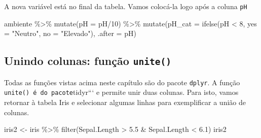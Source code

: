 \documentclass[
]{book}
\newenvironment{Shaded}{\begin{snugshade}}{\end{snugshade}}
\newcommand{\AttributeTok}[1]{\textcolor[rgb]{0.77,0.63,0.00}{#1}}
\newcommand{\DecValTok}[1]{\textcolor[rgb]{0.00,0.00,0.81}{#1}}
\newcommand{\FloatTok}[1]{\textcolor[rgb]{0.00,0.00,0.81}{#1}}
\newcommand{\FunctionTok}[1]{\textcolor[rgb]{0.00,0.00,0.00}{#1}}
\newcommand{\NormalTok}[1]{#1}
\newcommand{\OtherTok}[1]{\textcolor[rgb]{0.56,0.35,0.01}{#1}}
\newcommand{\SpecialCharTok}[1]{\textcolor[rgb]{0.00,0.00,0.00}{#1}}
\newcommand{\StringTok}[1]{\textcolor[rgb]{0.31,0.60,0.02}{#1}}
\begin{document}
A nova variável está no final da tabela. Vamos colocá-la logo após a coluna \texttt{pH}

\begin{Shaded}
\begin{Highlighting}[]
\NormalTok{ambiente }\SpecialCharTok{\%\textgreater{}\%} 
  \FunctionTok{mutate}\NormalTok{(}\AttributeTok{pH =}\NormalTok{ pH}\SpecialCharTok{/}\DecValTok{10}\NormalTok{) }\SpecialCharTok{\%\textgreater{}\%} 
  \FunctionTok{mutate}\NormalTok{(}\AttributeTok{pH\_cat =} \FunctionTok{ifelse}\NormalTok{(pH }\SpecialCharTok{\textless{}} \DecValTok{8}\NormalTok{, }\AttributeTok{yes =} \StringTok{"Neutro"}\NormalTok{, }\AttributeTok{no =} \StringTok{"Elevado"}\NormalTok{), }\AttributeTok{.after =}\NormalTok{ pH)}
\end{Highlighting}
\end{Shaded}

\hypertarget{unindo-colunas-funuxe7uxe3o-unite}{%
\subsection{\texorpdfstring{Unindo colunas: função \texttt{unite()}}{Unindo colunas: função unite()}}\label{unindo-colunas-funuxe7uxe3o-unite}}

Todas as funções vistas acima neste capítulo são do pacote \texttt{dplyr}. A função \texttt{unite()\ é\ do\ pacote}tidyr``` e permite unir duas colunas. Para isto, vamos retornar à tabela Iris e selecionar algumas linhas para exemplificar a união de colunas.

\begin{Shaded}
\begin{Highlighting}[]
\NormalTok{iris2 }\OtherTok{\textless{}{-}}\NormalTok{ iris }\SpecialCharTok{\%\textgreater{}\%} \FunctionTok{filter}\NormalTok{(Sepal.Length }\SpecialCharTok{\textgreater{}} \FloatTok{5.5} \SpecialCharTok{\&}\NormalTok{ Sepal.Length }\SpecialCharTok{\textless{}} \FloatTok{6.1}\NormalTok{)}
\NormalTok{iris2}
\end{Highlighting}
\end{Shaded}
\end{document}
